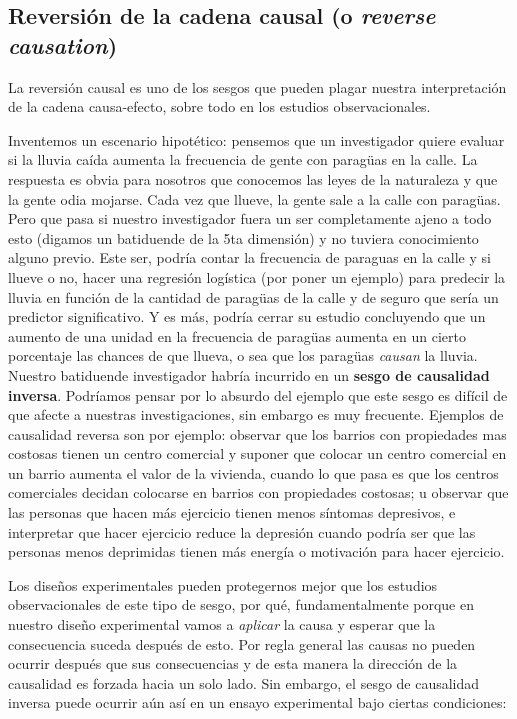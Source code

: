 \documentclass[
  letterpaper,
  DIV=11,
  numbers=noendperiod,
  oneside]{scrreprt}
\begin{document}
\hypertarget{reversiuxf3n-de-la-cadena-causal-o-reverse-causation}{%
\subsection{\texorpdfstring{Reversión de la cadena causal (o
\emph{reverse
causation})}{Reversión de la cadena causal (o reverse causation)}}\label{reversiuxf3n-de-la-cadena-causal-o-reverse-causation}}

La reversión causal es uno de los sesgos que pueden plagar nuestra
interpretación de la cadena causa-efecto, sobre todo en los estudios
observacionales.

Inventemos un escenario hipotético: pensemos que un investigador quiere
evaluar si la lluvia caída aumenta la frecuencia de gente con paragüas
en la calle. La respuesta es obvia para nosotros que conocemos las leyes
de la naturaleza y que la gente odia mojarse. Cada vez que llueve, la
gente sale a la calle con paragüas. Pero que pasa si nuestro
investigador fuera un ser completamente ajeno a todo esto (digamos un
batiduende de la 5ta dimensión) y no tuviera conocimiento alguno previo.
Este ser, podría contar la frecuencia de paraguas en la calle y si
llueve o no, hacer una regresión logística (por poner un ejemplo) para
predecir la lluvia en función de la cantidad de paragüas de la calle y
de seguro que sería un predictor significativo. Y es más, podría cerrar
su estudio concluyendo que un aumento de una unidad en la frecuencia de
paragüas aumenta en un cierto porcentaje las chances de que llueva, o
sea que los paragüas \emph{causan} la lluvia. Nuestro batiduende
investigador habría incurrido en un \textbf{sesgo de causalidad
inversa}. Podríamos pensar por lo absurdo del ejemplo que este sesgo es
difícil de que afecte a nuestras investigaciones, sin embargo es muy
frecuente. Ejemplos de causalidad reversa son por ejemplo: observar que
los barrios con propiedades mas costosas tienen un centro comercial y
suponer que colocar un centro comercial en un barrio aumenta el valor de
la vivienda, cuando lo que pasa es que los centros comerciales decidan
colocarse en barrios con propiedades costosas; u observar que las
personas que hacen más ejercicio tienen menos síntomas depresivos, e
interpretar que hacer ejercicio reduce la depresión cuando podría ser
que las personas menos deprimidas tienen más energía o motivación para
hacer ejercicio.

Los diseños experimentales pueden protegernos mejor que los estudios
observacionales de este tipo de sesgo, por qué, fundamentalmente porque
en nuestro diseño experimental vamos a \emph{aplicar} la causa y esperar
que la consecuencia suceda después de esto. Por regla general las causas
no pueden ocurrir después que sus consecuencias y de esta manera la
dirección de la causalidad es forzada hacia un solo lado. Sin embargo,
el sesgo de causalidad inversa puede ocurrir aún así en un ensayo
experimental bajo ciertas condiciones:
\end{document}
